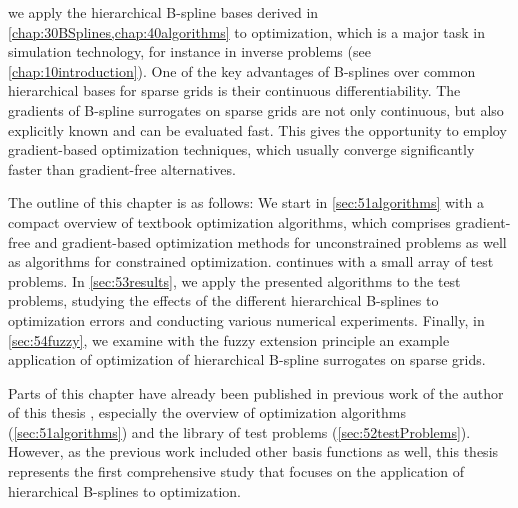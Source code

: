 
\label{chap:50optimization}

we apply the hierarchical B-spline bases derived in
\cref{chap:30BSplines,chap:40algorithms} to optimization,
which is a major task in simulation technology,
for instance in inverse problems (see \cref{chap:10introduction}).
One of the key advantages of B-splines over common hierarchical bases for
sparse grids is their continuous differentiability.
The gradients of B-spline surrogates on sparse grids are not only continuous,
but also explicitly known and can be evaluated fast.
This gives the opportunity to employ gradient-based optimization techniques,
which usually converge significantly faster than gradient-free alternatives.

The outline of this chapter is as follows:
We start in \cref{sec:51algorithms}
with a compact overview of textbook optimization algorithms,
which comprises gradient-free and gradient-based optimization methods
for unconstrained problems as well as algorithms for constrained optimization.
 continues with a small array of test problems.
In \cref{sec:53results}, we apply the presented algorithms
to the test problems, studying the effects of the different
hierarchical B-splines to optimization errors and conducting various
numerical experiments.
Finally, in \cref{sec:54fuzzy}, we examine with the fuzzy extension principle
an example application of optimization of hierarchical B-spline surrogates on
sparse grids.

Parts of this chapter have already been published in previous work
of the author of this thesis \cite{Valentin14Hierarchische}, especially
the overview of optimization algorithms (\cref{sec:51algorithms})
and the library of test problems (\cref{sec:52testProblems}).
However, as the previous work included other basis functions as well,
this thesis represents the first comprehensive study
that focuses on the application of hierarchical B-splines to optimization.






\cleardoublepage
